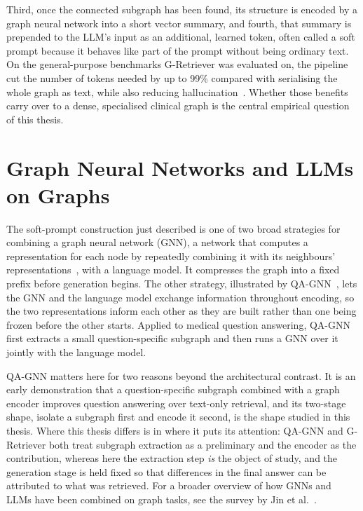 Third, once the connected subgraph has been found, its structure is encoded by a
graph neural network into a short vector summary, and fourth, that summary is
prepended to the LLM's input as an additional, learned token, often called a soft
prompt because it behaves like part of the prompt without being ordinary text. On
the general-purpose benchmarks G-Retriever was evaluated on, the pipeline cut the
number of tokens needed by up to 99\% compared with serialising the whole graph
as text, while also reducing hallucination~\cite{he2024gretriever}. Whether those
benefits carry over to a dense, specialised clinical graph is the central
empirical question of this thesis.

\section{Graph Neural Networks and LLMs on Graphs} \label{sec:gnn-llm}

The soft-prompt construction just described is one of two broad strategies for
combining a graph neural network (GNN), a network that computes a representation
for each node by repeatedly combining it with its neighbours'
representations~\cite{velickovic2018gat}, with a language model. It compresses
the graph into a fixed prefix before generation begins. The other strategy,
illustrated by QA-GNN~\cite{yasunaga2021qagnn}, lets the GNN and the language
model exchange information throughout encoding, so the two representations inform
each other as they are built rather than one being frozen before the other
starts. Applied to medical question answering, QA-GNN first extracts a small
question-specific subgraph and then runs a GNN over it jointly with the language
model.

QA-GNN matters here for two reasons beyond the architectural contrast. It is an
early demonstration that a question-specific subgraph combined with a graph
encoder improves question answering over text-only retrieval, and its two-stage
shape, isolate a subgraph first and encode it second, is the shape studied in this
thesis. Where this thesis differs is in where it puts its attention: QA-GNN and
G-Retriever both treat subgraph extraction as a preliminary and the encoder as
the contribution, whereas here the extraction step \emph{is} the object of study,
and the generation stage is held fixed so that differences in the final answer
can be attributed to what was retrieved. For a broader overview of how GNNs and
LLMs have been combined on graph tasks, see the survey by Jin et
al.~\cite{jin2023llmgraphsurvey}.

